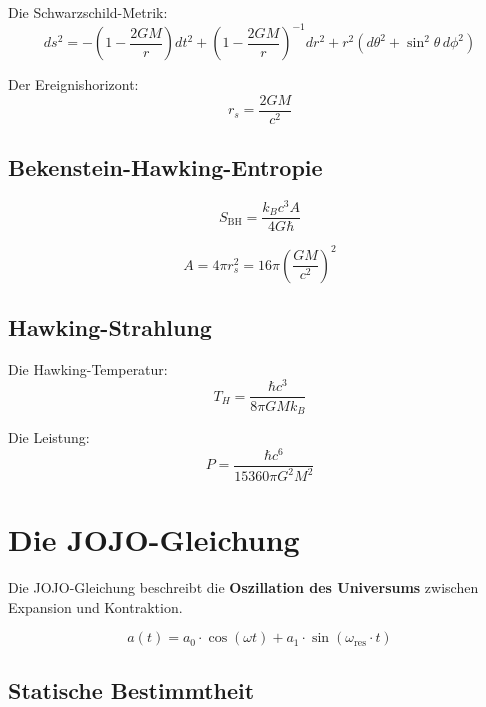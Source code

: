 \documentclass[11pt,a4paper]{article}
\begin{document}
Die Schwarzschild-Metrik:
\begin{equation}
ds^2 = -\left(1 - \frac{2GM}{r}\right)dt^2 + \left(1 - \frac{2GM}{r}\right)^{-1}dr^2 + r^2(d\theta^2 + \sin^2\theta \, d\phi^2)
\end{equation}

Der Ereignishorizont:
\begin{equation}
r_s = \frac{2GM}{c^2}
\end{equation}

\subsection{Bekenstein-Hawking-Entropie}

\begin{equation}
S_{\text{BH}} = \frac{k_B c^3 A}{4G\hbar}
\end{equation}

\begin{equation}
A = 4\pi r_s^2 = 16\pi \left(\frac{GM}{c^2}\right)^2
\end{equation}

\subsection{Hawking-Strahlung}

Die Hawking-Temperatur:
\begin{equation}
T_H = \frac{\hbar c^3}{8\pi G M k_B}
\end{equation}

Die Leistung:
\begin{equation}
P = \frac{\hbar c^6}{15360\pi G^2 M^2}
\end{equation}

\section{Die JOJO-Gleichung}

Die JOJO-Gleichung beschreibt die \textbf{Oszillation des Universums} zwischen Expansion und Kontraktion.

\begin{equation}
a(t) = a_0 \cdot \cos(\omega t) + a_1 \cdot \sin(\omega_{\text{res}} \cdot t)
\end{equation}

\subsection{Statische Bestimmtheit}
\end{document}
